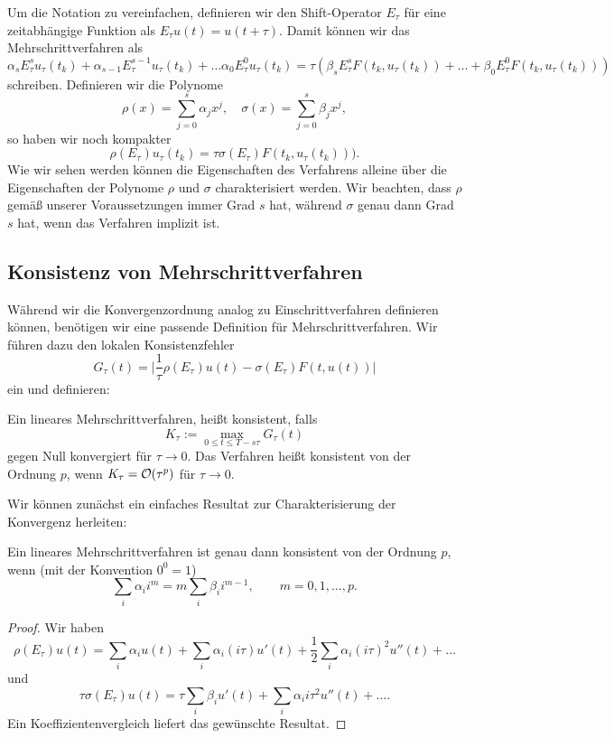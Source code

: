Um die Notation zu vereinfachen, definieren wir den Shift-Operator $E_\tau$ für eine zeitabhängige Funktion als
$ E_\tau u(t) = u(t+\tau).$ Damit können wir das Mehrschrittverfahren als
$$ \alpha_s E_\tau^s u_\tau(t_k)+ \alpha_{s-1} E_\tau^{s-1} u_\tau(t_k) + \ldots \alpha_0 E_\tau^0 u_\tau(t_k) = 
\tau( \beta_s E_\tau^s F(t_k,u_\tau(t_k)) + \ldots + \beta_0 E_\tau^0 F(t_k,u_\tau(t_k)))$$
schreiben. Definieren wir die Polynome
$$ \rho(x) = \sum_{j=0}^s \alpha_j x^j, \quad \sigma(x) = \sum_{j=0}^s \beta_j x^j, $$
so haben wir noch kompakter
$$ \rho(E_\tau) u_\tau(t_k)  = \tau \sigma(E_\tau) F(t_k,u_\tau(t_k))).$$
Wie wir sehen werden können die Eigenschaften des Verfahrens alleine über die Eigenschaften der Polynome $\rho$ und $\sigma$ charakterisiert werden. Wir beachten, dass $\rho$ gem{ä}{\ss} unserer Voraussetzungen immer Grad $s$ hat, während $\sigma$ genau dann Grad $s$ hat, wenn das Verfahren implizit ist. 

\subsection{Konsistenz von Mehrschrittverfahren} 

Während wir die Konvergenzordnung analog zu Einschrittverfahren definieren können, benötigen wir eine passende Definition für Mehrschrittverfahren. Wir führen dazu den lokalen Konsistenzfehler 
$$
G_\tau(t) = \vert  \frac{1}\tau \rho(E_\tau) u(t) - \sigma(E_\tau) F(t,u(t)) \vert
$$
ein und definieren:

\begin{definition}{}{}
Ein lineares Mehrschrittverfahren, hei{\ss}t konsistent, falls
$$ K_\tau:=\max_{0 \leq t \leq T-s\tau} G_\tau(t) $$
gegen Null konvergiert für $\tau \rightarrow 0$. Das Verfahren hei{\ss}t konsistent von der Ordnung $p$, wenn $K_\tau = {\cal O}(\tau^p)$ für $\tau \rightarrow 0$. 
\end{definition}

Wir können zunächst ein einfaches Resultat zur Charakterisierung der Konvergenz herleiten:
\begin{lemma}{}{}
Ein lineares Mehrschrittverfahren ist genau dann konsistent von der Ordnung $p$, wenn (mit der Konvention $0^0 =1$)
$$   \sum_i \alpha_i i^m =  m \sum_i \beta_i i^{m-1} , \qquad m=0,1,\ldots,p. $$
\end{lemma}
%
%
\begin{proof}
Wir haben
$$ \rho(E_\tau) u(t) = \sum_i \alpha_i u(t) + \sum_i \alpha_i (i\tau) u'(t) + \frac{1}2  \sum_i \alpha_i (i\tau)^2 u''(t) + \ldots $$
und
$$ \tau \sigma(E_\tau) u(t) = \tau \sum_i \beta_i u'(t)  + \sum_i \alpha_i i\tau^2 u''(t) + \ldots . $$
Ein Koeffizientenvergleich liefert das gewünschte Resultat.
\end{proof}

